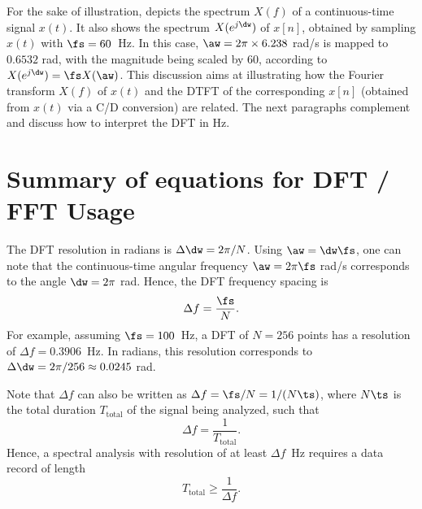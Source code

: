 For the sake of illustration,  depicts the spectrum $X(f)$ of a continuous-time signal $x(t)$. It also shows the spectrum $X(e^{j\dw})$ of $x[n]$, obtained by sampling $x(t)$ with $\fs=60$~Hz.
In this case, $\aw =  2 \pi \times 6.238$ rad/s is mapped to $0.6532$ rad, with the magnitude being scaled by 60, according to $X(e^{j\dw}) = \fs X(\aw)$. This discussion aims at illustrating how the Fourier transform $X(f)$ of $x(t)$ and the DTFT of the corresponding $x[n]$ (obtained from $x(t)$ via a C/D conversion) are related. The next paragraphs  complement  and discuss how to interpret the DFT in Hz.


\section{{\akadvanced} Summary of equations for DFT / FFT Usage}

The DFT resolution in radians is $\Delta \dw = 2 \pi / N$.
Using $\aw = \dw \fs$, one can note that the continuous-time angular frequency $\aw = 2 \pi \fs$ rad/s corresponds to the angle $\dw = 2 \pi$ rad. Hence, the DFT frequency spacing is
\begin{equation}
\Delta f = \frac{\fs} {N}.
\label{eq:fft_freq_resolution}
\end{equation}
For example, assuming $\fs=100$~Hz, a DFT of $N=256$ points has a resolution of $\Delta f = 0.3906$~Hz. In radians, this resolution corresponds to 
$\Delta \dw = 2 \pi / 256 \approx 0.0245$ rad.

Note that $\Delta f$ can also be written as $\Delta f = \fs/N = 1/(N \ts)$, where $N \ts$ is the total duration $T_{\textrm{total}}$ of the signal being analyzed, such that
\begin{equation}
\Delta f = \frac{1}{T_{\textrm{total}}}.
\label{eq:fft_total_duration}
\end{equation}
Hence, a spectral analysis with resolution of at least $\Delta f$~Hz requires a data record of length 
\begin{equation}
T_{\textrm{total}} \ge \frac{1}{\Delta f}.
\label{eq:fft_total_duration2}
\end{equation}

